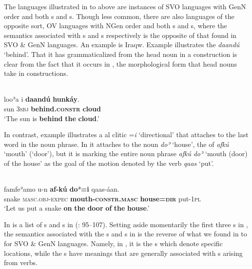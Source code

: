 \documentclass[output=paper]{langsci/langscibook}
\begin{document}
\clearpage 
The languages illustrated in  to 
above are instances of SVO languages with GenN order and both s and s. Though less common, there are also languages of the opposite sort, OV languages with NGen order and both s and s, where the semantics associated with s and s respectively is the opposite of that found in SVO \& GenN languages. An example is Iraqw. Example  illustrates the  \textit{daandú} ‘behind’. That it has grammaticalized from the head noun in a  construction is clear from the fact that it occurs in , the morphological form that head nouns take in  constructions.

\ea\label{ex:dryer:30}
\\
\gll   looʾa  i  \textbf{daandú}  \textbf{hunkáy}.\\
       sun  3\textsc{sbj}  \textbf{behind.\textsc{constr}}  \textbf{cloud} \\
\glt ‘The sun is \textbf{behind} \textbf{the} \textbf{cloud}.’
\z

\noindent In contrast, example  illustrates a al clitic =\textit{i} ‘directional’ that attaches to the last word in the noun phrase. In  it attaches to the noun \textit{doʾ} ‘house’, the  of \textit{afkú} ‘mouth’ (‘door’), but it is marking the entire noun phrase \textit{afkú} \textit{doʾ} ‘mouth (door) of the house’ as the goal of the motion  denoted by the verb \textit{qaas} ‘put’.

\ea\label{ex:dryer:31}
\\
\gll famfeʾamo  u-n  \textbf{af-kú}  \textbf{doʾ=i}  qaas-áan.\\
       snake  \textsc{masc.obj-expec}  \textbf{mouth-\textsc{constr.masc}}  \textbf{house=\textsc{dir}}  put-\textsc{1pl}  \\
\glt ‘Let us put a snake \textbf{on} \textbf{the} \textbf{door} \textbf{of} \textbf{the} \textbf{house}.’
\z

In  is a list of s and s in  (\citealt{Mous1993}: 95–107). Setting aside momentarily the first three s in , the semantics associated with the s and s in  is the reverse of what we found in  to  for SVO \& GenN languages. Namely, in , it is the s which denote specific locations, while the s have meanings that are generally associated with s arising from verbs.
\end{document}
